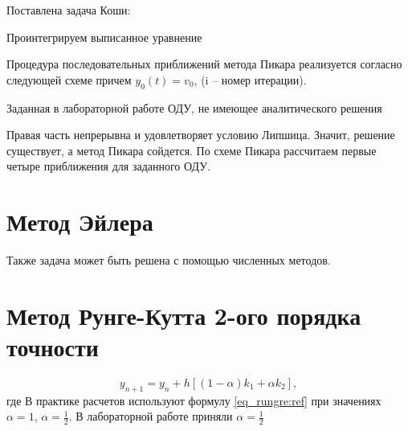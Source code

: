 Поставлена задача Коши:

Проинтегрируем выписанное уравнение

Процедура последовательных приближений метода Пикара реализуется согласно следующей схеме
причем $y_0(t) = v_0$, (i – номер итерации).

Заданная в лабораторной работе ОДУ, не имеющее аналитического решения

Правая часть непрерывна и удовлетворяет условию Липшица. Значит, решение существует, а метод Пикара сойдется. По схеме Пикара рассчитаем первые четыре приближения для заданного ОДУ.

\section{Метод Эйлера}
Также задача может быть решена с помощью численных методов. 


\section{Метод Рунге-Кутта 2-ого порядка точности}
\begin{equation}
	y_{n+1} = y_n + h[(1 - \alpha) k_1 + \alpha k_2],
	\label{eq_rungre:ref}
\end{equation}
где  
В практике расчетов используют формулу \eqref{eq_rungre:ref} при значениях $\alpha = 1$, $\alpha = \frac{1}{2}$. В лабораторной работе приняли $\alpha = \frac{1}{2}$
